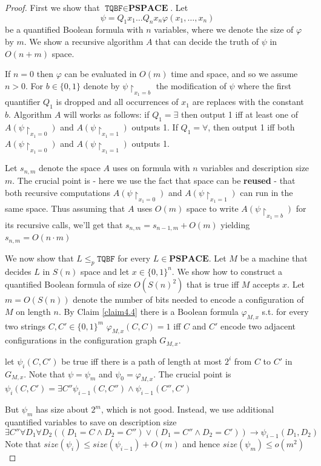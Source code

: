 \documentclass[11pt]{article}
\def \PSPACE {\textbf{PSPACE}}
\def \TQBF {\texttt{TQBF}}
\begin{document}
\begin{proof}
First we show that \(\TQBF\in\PSPACE\). Let
\begin{equation*}
\psi=Q_1x_1\dots Q_nx_n\varphi(x_1,\dots,x_n)
\end{equation*}
be a quantified Boolean formula with \(n\) variables, where we denote the size of \(\varphi\) by \(m\). We
show a recursive algorithm \(A\) that can decide the truth of \(\psi\) in \(O(n+m)\) space.

If \(n=0\) then \(\varphi\) can be evaluated in \(O(m)\) time and space, and so we assume \(n>0\).
For \(b\in\{0,1\}\) denote by \(\psi\restriction_{x_1=b}\) the modification of \(\psi\) where the first
quantifier \(Q_1\) is dropped and all occurrences of \(x_1\) are replaces with the constant \(b\).
Algorithm \(A\) will works as follows: if \(Q_1=\exists\) then output 1 iff at least one
of \(A(\psi\restriction_{x_1=0})\)  and \(A(\psi\restriction_{x_1=1})\) outputs 1. If \(Q_1=\forall\), then
output 1 iff both  \(A(\psi\restriction_{x_1=0})\)  and \(A(\psi\restriction_{x_1=1})\) outputs 1.

Let \(s_{n,m}\) denote the space \(A\) uses on formula with \(n\) variables and description
size \(m\). The crucial point is - here we use the fact that space can be \textbf{reused} - that both
recursive computations  \(A(\psi\restriction_{x_1=0})\)  and \(A(\psi\restriction_{x_1=1})\) can run in
the same space. Thus assuming that \(A\) uses \(O(m)\) space to
write  \(A(\psi\restriction_{x_1=b})\) for its recursive calls, we'll get that
\(s_{n,m}=s_{n-1,m}+O(m)\) yielding \(s_{n,m}=O(n\cdot m)\)

We now show that \(L\le_p\TQBF\) for every \(L\in\PSPACE\). Let \(M\) be a machine that
decides \(L\) in \(S(n)\) space and let \(x\in\{0,1\}^n\). We show how to construct a quantified
Boolean formula of size \(O(S(n)^2)\) that is true iff \(M\) accepts \(x\). Let \(m=O(S(n))\)
denote the number of bits needed to encode a configuration of \(M\) on length \(n\). By Claim
\ref{claim4.4} there is a Boolean formula \(\varphi_{M,x}\) s.t. for every two
strings \(C,C'\in\{0,1\}^m\) \(\varphi_{M,x}(C,C)=1\) iff \(C\) and \(C'\) encode two adjacent
configurations in the configuration graph \(G_{M,x}\).

let \(\psi_i(C,C')\) be true iff there is a path of length at most \(2^i\) from \(C\) to \(C'\)
in \(G_{M,x}\). Note that \(\psi=\psi_m\) and \(\psi_0=\varphi_{M,x}\). The crucial point is
\(\psi_i(C,C')=\exists C''\psi_{i-1}(C,C'')\wedge\psi_{i-1}(C'',C')\)

But \(\psi_m\) has size about \(2^m\), which is not good. Instead, we use additional quantified
variables to save on description size
\begin{equation*}
\exists C''\forall D_1\forall D_2((D_1=C\wedge D_2=C'')\vee(D_1=C''\wedge D_2=C'))\to \psi_{i-1}(D_1,D_2)
\end{equation*}
Note that \(size(\psi_i)\le size(\psi_{i-1})+O(m)\) and hence \(size(\psi_m)\le o(m^2)\)
\end{proof}
\end{document}
